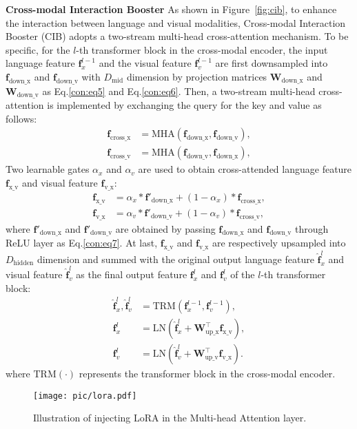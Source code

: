 \documentclass[10pt,twocolumn,letterpaper]{article}
\def\vf{{\bm{f}}}
\def\mW{{\bm{W}}}
\begin{document}
\noindent\textbf{Cross-modal Interaction Booster}
As shown in Figure~\ref{fig:cib}, to enhance the interaction between language and visual modalities, Cross-modal Interaction Booster (CIB) adopts a two-stream multi-head cross-attention mechanism. 
To be specific, for the $l$-th transformer block in the cross-modal encoder, the input language feature $\vf_x^{l-1}$ and the visual feature $\vf_v^{l-1}$ are first downsampled into  $\vf_\text{down\_x}$ and $\vf_\text{down\_v}$ with $D_\text{mid}$ dimension by projection matrices $\mW_\text{down\_x}$ and $\mW_\text{down\_v}$ as Eq.\ref{con:eq5} and Eq.\ref{con:eq6}. Then, a two-stream multi-head cross-attention is implemented by exchanging the query for the key and value as follows:
\begin{align}
\vf_\text{cross\_x} &= \text{MHA}(\vf_\text{down\_x}, \vf_\text{down\_v}), \\
\vf_\text{cross\_v} &= \text{MHA}(\vf_\text{down\_v}, \vf_\text{down\_x}), 
\end{align}
Two learnable gates $\alpha_x$ and $\alpha_v$ are used to obtain cross-attended language feature $\vf_\text{x\_v}$ and visual feature $\vf_\text{v\_x}$: \begin{align} 
\vf_\text{x\_v} &= \alpha_x\ast\vf'_\text{down\_x} + (1-\alpha_x)\ast\vf_\text{cross\_x}, \\
\vf_\text{v\_x} &= \alpha_v\ast\vf'_\text{down\_v} + (1-\alpha_v)\ast\vf_\text{cross\_v},
\end{align}
where $\vf'_\text{down\_x}$ and $\vf'_\text{down\_v}$ are obtained by passing $\vf_\text{down\_x}$ and $\vf_\text{down\_v}$ through ReLU layer as Eq.\ref{con:eq7}. 
At last, $\vf_\text{x\_v}$ and $\vf_\text{v\_x}$ are respectively upsampled into $D_\text{hidden}$ dimension and summed with the original output language feature ${\hat{\vf}}_x^{l}$ and visual feature ${\hat{\vf}}_v^{l}$ as the final output feature $\vf_{x}^{l}$ and $\vf_{v}^{l}$ of the $l$-th transformer block:
\begin{align} 
\hat{{\vf}}_{x}^{l},\hat{{\vf}}_{v}^{l} &= \text{TRM}(\vf_{x}^{l-1}, \vf_{v}^{l-1}), \\
\vf_{x}^{l} &= \text{LN}(\hat{{\vf}}_{x}^{l} + \mW_{\text{up\_x}}^\intercal\vf_\text{x\_v}), \\
\vf_{v}^{l} &= \text{LN}(\hat{{\vf}}_{v}^{l} + \mW_{\text{up\_v}}^\intercal\vf_\text{v\_x}).
\end{align}
where $\text{TRM}(\cdot )$ represents the transformer block in the cross-modal encoder.

\begin{figure}[!t]
	\begin{center}
		\texttt{[image: pic/lora.pdf]}
	\end{center}
	\vspace{-18pt}
	\caption{Illustration of injecting LoRA in the Multi-head Attention layer.}
	\label{fig:lora}
	\vspace{-16pt}
\end{figure}
\end{document}
